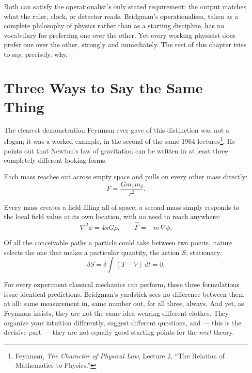 \documentclass[12pt]{book}
\begin{document}
Both can satisfy the operationalist's only stated requirement: the output matches what the ruler, clock, or detector reads. Bridgman's operationalism, taken as a complete philosophy of physics rather than as a starting discipline, has no vocabulary for preferring one over the other. Yet every working physicist does prefer one over the other, strongly and immediately. The rest of this chapter tries to say, precisely, why.

\section{Three Ways to Say the Same Thing}
\label{sec:three-ways}

The clearest demonstration Feynman ever gave of this distinction was not a slogan; it was a worked example, in the second of the same 1964 lectures\footnote{Feynman, \emph{The Character of Physical Law}, Lecture 2, ``The Relation of Mathematics to Physics.''}. He points out that Newton's law of gravitation can be written in at least three completely different-looking forms.

\begin{description}[leftmargin=1.4em, style=nextline]
\item[Action at a distance.] Each mass reaches out across empty space and pulls on every other mass directly:
\[
  F = \frac{G m_1 m_2}{r^2}.
\]
\item[The field method.] Every mass creates a field filling all of space; a second mass simply responds to the local field value at its own location, with no need to reach anywhere:
\[
  \nabla^2 \phi = 4\pi G \rho, \qquad \vec F = -m\,\nabla \phi.
\]
\item[The principle of least action.] Of all the conceivable paths a particle could take between two points, nature selects the one that makes a particular quantity, the action $S$, stationary:
\[
  \delta S = \delta\!\int (T - V)\, dt = 0.
\]
\end{description}

For every experiment classical mechanics can perform, these three formulations issue identical predictions. Bridgman's yardstick sees no difference between them at all: same measurement in, same number out, for all three, always. And yet, as Feynman insists, they are not the same idea wearing different clothes. They organize your intuition differently, suggest different questions, and --- this is the decisive part --- they are not equally good starting points for the \emph{next} theory.
\end{document}
